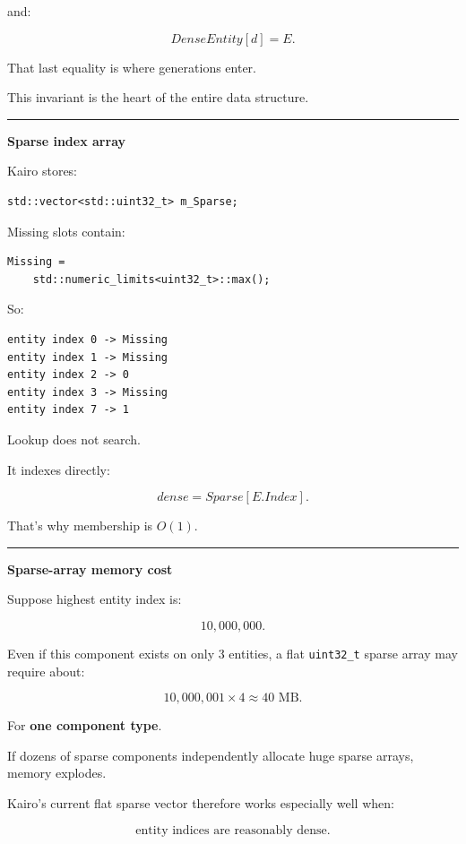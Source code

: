 and:

\[
DenseEntity[d]=E.
\]

That last equality is where generations enter.

This invariant is the heart of the entire data structure.

\begin{center}\rule{0.5\linewidth}{0.5pt}\end{center}

\textbf{Sparse index array}

Kairo stores:

\begin{verbatim}
std::vector<std::uint32_t> m_Sparse;
\end{verbatim}

Missing slots contain:

\begin{verbatim}
Missing =
    std::numeric_limits<uint32_t>::max();
\end{verbatim}

So:

\begin{verbatim}
entity index 0 -> Missing
entity index 1 -> Missing
entity index 2 -> 0
entity index 3 -> Missing
entity index 7 -> 1
\end{verbatim}

Lookup does not search.

It indexes directly:

\[
dense=Sparse[E.Index].
\]

That's why membership is \(O(1)\).

\begin{center}\rule{0.5\linewidth}{0.5pt}\end{center}

\textbf{Sparse-array memory cost}

Suppose highest entity index is:

\[
10,000,000.
\]

Even if this component exists on only 3 entities, a flat \texttt{uint32\_t} sparse array may require about:

\[
10,000,001\times4
\approx40\text{ MB}.
\]

For \textbf{one component type}.

If dozens of sparse components independently allocate huge sparse arrays, memory explodes.

Kairo's current flat sparse vector therefore works especially well when:

\[
\text{entity indices are reasonably dense}.
\]

